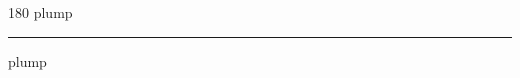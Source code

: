 
\begin{frame}
\begin{center}
\begin{turn}{180}
{\fontsize{2.5cm}{1em}\selectfont plump}
\end{turn}
\vspace{1em}\par  
\hrule
\vspace{1em}\par  
{\fontsize{2.5cm}{1em}\selectfont plump}
\end{center}
\end{frame}
